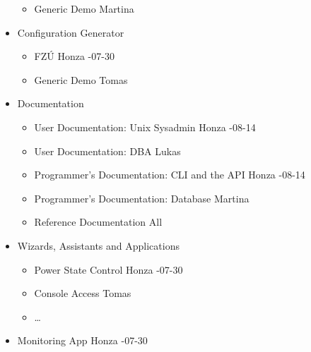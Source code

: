 \documentclass{article}
\begin{document}
\begin{itemize}
\begin{itemize}
            \item Generic Demo \tab Martina
        \end{itemize}
    \item Configuration Generator
        \begin{itemize}
            \item FZÚ \tab Honza -07-30
            \item Generic Demo \tab Tomas
        \end{itemize}
    \item Documentation
        \begin{itemize}
            \item User Documentation: Unix Sysadmin \tab Honza -08-14
            \item User Documentation: DBA \tab Lukas
            \item Programmer's Documentation: CLI and the API \tab Honza -08-14
            \item Programmer's Documentation: Database \tab Martina
            \item Reference Documentation \tab All
        \end{itemize}
    \item Wizards, Assistants and Applications
        \begin{itemize}
            \item Power State Control \tab Honza -07-30
            \item Console Access \tab Tomas
            \item \ldots
        \end{itemize}
    \item Monitoring App \tab Honza -07-30
\end{itemize}
\end{document}
